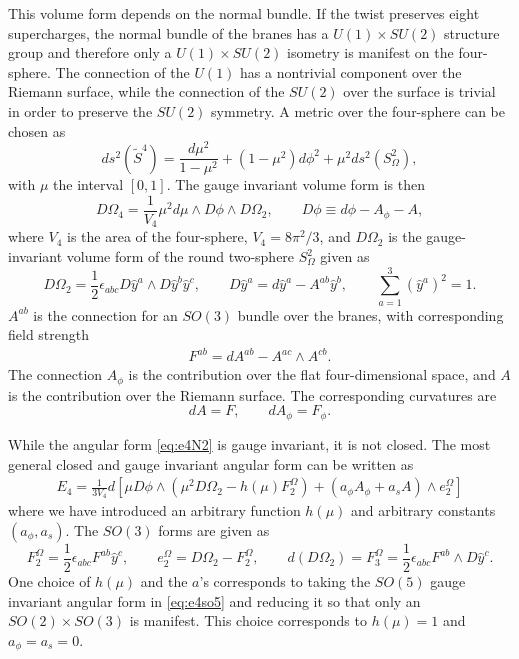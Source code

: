 \documentclass[a4paper,11pt]{article}
\newcommand{\ba}[1]{\begin{align} #1 \end{align} }
\begin{document}
This volume form depends on the normal bundle.  
If the twist preserves eight supercharges, the normal bundle of the branes has a $U(1)\times SU(2)$ structure group and therefore only a $U(1)\times SU(2)$ isometry is manifest on the four-sphere.  The connection of the $U(1)$ has a nontrivial component over the Riemann surface, while the connection of the $SU(2)$ over the surface is trivial in order to preserve the $SU(2)$ symmetry.  A metric over the four-sphere can be chosen as
\begin{equation}
ds^2(\widetilde{S}^4)= \frac{d\mu^2}{1-\mu^2} + (1-\mu^2) d\phi^2 + \mu^2 ds^2(S^2_\Omega),\label{eq:metric}
\end{equation}  with $\mu$ the interval $[0,1]$. The gauge invariant volume form is then
\begin{equation}
D \Omega_4 = \frac{1}{V_4} \mu^2 d\mu \wedge D\phi  \wedge D \Omega_2, \qquad D\phi \equiv d\phi -A_\phi - A,  \label{eq:e4N2}
\end{equation} where $V_4$ is the area of the four-sphere, $V_4=8\pi^2/3$, and $D\Omega_2$ is the gauge-invariant volume form of the round two-sphere $S_\Omega^2$ given as
\begin{equation}
 D\Omega_2 = \frac{1}{2} \epsilon_{abc} D \hat{y}^a \wedge D \hat{y}^b \hat{y}^c, \qquad D\hat{y}^a = d\hat{y}^a - A^{ab}\hat{y}^b, \qquad \sum_{a=1}^3 (\hat{y}^a)^2 =1.
\end{equation}  $A^{ab}$ is the connection for an $SO(3)$ bundle over the branes, with corresponding field strength 
\ba{
F^{ab} = d A^{ab} - A^{ac} \wedge A^{cb}.
}
The connection $A_\phi$ is the contribution over the flat four-dimensional space, and $A$ is the contribution over the Riemann surface. The corresponding curvatures are
\begin{equation}
dA = F, \qquad d A_\phi = F_\phi.  
\end{equation} 

While the angular form \eqref{eq:e4N2} is gauge invariant, it is not closed.  The most general closed and gauge invariant angular form can be written as 
\begin{align}
E_4 = \frac{1}{3V_4} d \left[ \mu D\phi \wedge \left(\mu^2D\Omega_2 - h(\mu) F_2^\Omega \right) + \left(a_\phi A_\phi + a_s A\right) \wedge e_2^\Omega\right]  \label{eq:genE4}
\end{align} where we have introduced an arbitrary function $h(\mu)$ and arbitrary constants $(a_\phi, a_s)$.  The $SO(3)$ forms are given as
\begin{equation}
F^\Omega_2 = \frac{1}{2} \epsilon_{abc} F^{ab} \hat{y}^c, \qquad e_2^\Omega = D\Omega_2 -F_2^\Omega, \qquad d(D\Omega_2 ) =  F^\Omega_3 =\frac{1}{2} \epsilon_{abc} F^{ab} \wedge D\hat{y}^c.  
\end{equation} One choice of $h(\mu)$ and the $a$'s corresponds to taking the $SO(5)$ gauge invariant angular form in \eqref{eq:e4so5} and reducing it so that only an $SO(2)\times SO(3)$ is manifest.  This choice corresponds to $h(\mu)=1$ and $a_\phi =a_s =0$.  
\end{document}
